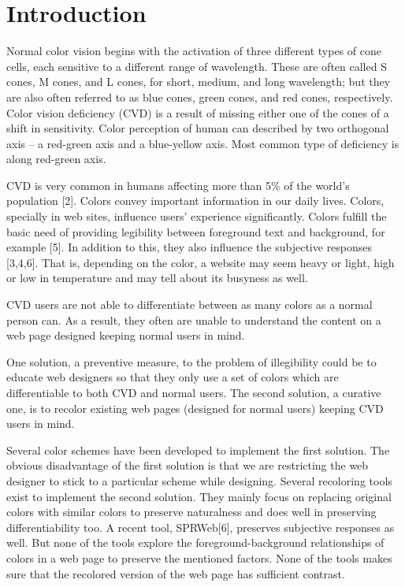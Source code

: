 \chapter{Introduction}
\thispagestyle{plain}

\label{Introduction}

Normal color vision begins with the activation of three different types of cone cells, each sensitive to a different range of wavelength.   These are often called S cones, M cones, and L cones, for short, medium, and long wavelength; but they are also often referred to as blue cones, green cones, and red cones, respectively. Color vision deficiency (CVD) is a result of missing either one of the cones of a shift in sensitivity. Color perception of human can described by two orthogonal axis – a red-green axis and a blue-yellow axis. Most common type of deficiency is  along red-green axis.

CVD is very common in humans affecting more than 5\% of the world's population [2]. Colors convey important information in our daily lives. Colors, specially in web sites, influence users' experience significantly. Colors fulfill the basic need of providing legibility between foreground text and background, for example [5]. In addition to this, they also influence the subjective responses [3,4,6]. That is, depending on the color, a website may seem heavy or light, high or low in temperature and may tell about its busyness as well. 

CVD users are not able to differentiate between as many colors as a normal person can. As a result, they often are unable to understand the content on a web page designed keeping normal users in mind.  
  
One solution, a preventive measure, to the problem of illegibility could be to educate web designers so that they only use a set of colors which are differentiable to both CVD and normal users. The second solution, a curative one, is to recolor existing web pages (designed for normal users) keeping CVD users in mind.

Several color schemes have been developed to implement the first solution. The obvious disadvantage of the first solution is that we are restricting the web designer to stick to a particular scheme while designing. Several recoloring tools exist to implement the second solution. They mainly focus	on replacing original colors with similar colors to preserve naturalness and does well in preserving differentiability too. A recent tool, SPRWeb[6], preserves subjective responses as well. But none of the tools explore the foreground-background relationships of colors in a web page to preserve the mentioned factors. None of the tools makes sure that the recolored version of the web page has sufficient contrast.

